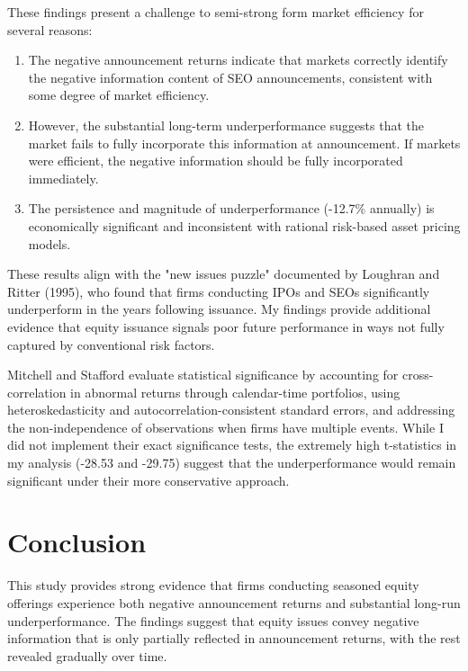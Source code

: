 \documentclass[12pt]{article}
\begin{document}
These findings present a challenge to semi-strong form market efficiency for several reasons:

\begin{enumerate}
    \item The negative announcement returns indicate that markets correctly identify the negative information content of SEO announcements, consistent with some degree of market efficiency.
    
    \item However, the substantial long-term underperformance suggests that the market fails to fully incorporate this information at announcement. If markets were efficient, the negative information should be fully incorporated immediately.
    
    \item The persistence and magnitude of underperformance (-12.7\% annually) is economically significant and inconsistent with rational risk-based asset pricing models.
\end{enumerate}

These results align with the "new issues puzzle" documented by Loughran and Ritter (1995), who found that firms conducting IPOs and SEOs significantly underperform in the years following issuance. My findings provide additional evidence that equity issuance signals poor future performance in ways not fully captured by conventional risk factors.

Mitchell and Stafford evaluate statistical significance by accounting for cross-correlation in abnormal returns through calendar-time portfolios, using heteroskedasticity and autocorrelation-consistent standard errors, and addressing the non-independence of observations when firms have multiple events. While I did not implement their exact significance tests, the extremely high t-statistics in my analysis (-28.53 and -29.75) suggest that the underperformance would remain significant under their more conservative approach.

\section{Conclusion}

This study provides strong evidence that firms conducting seasoned equity offerings experience both negative announcement returns and substantial long-run underperformance. The findings suggest that equity issues convey negative information that is only partially reflected in announcement returns, with the rest revealed gradually over time.
\end{document}
